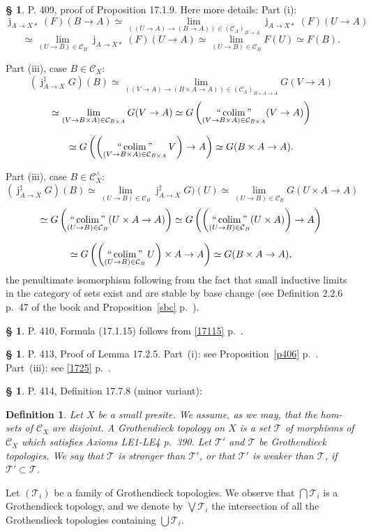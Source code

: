 \documentclass[12pt]{article}
\newtheorem{df}[thm]{Definition}%
\theoremstyle{remark}
\theoremstyle{definition}
\newtheorem{s}[thm]{\S}
\newcommand{\cc}{\mathcal}
\newcommand{\oo}{\operatorname}
\newcommand{\C}{\mathcal C}
\newcommand{\mv}{ (minor variant)}
\DeclareMathOperator*{\coli}{colim}
\DeclareMathOperator*{\ic}{``\coli"}
\begin{document}
%
%
\begin{s}%
P. 409, proof of Proposition 17.1.9. Here more details: Part (i): 
$$
\oo j_{A\to X*}(F)(B\to A)\simeq
\lim_{((U\to A)\to(B\to A))\in(\C_A)_{B\to A}}\oo j_{A\to X*}(F)(U\to A)
$$
$$
\simeq\lim_{(U\to B)\in\C_B}\oo j_{A\to X*}(F)(U\to A)\simeq
\lim_{(U\to B)\in\C_B}F(U)\simeq F(B).
$$

Part (iii), case $B\in\C_X$: 
$$
(\oo j^\ddagger_{A\to X} G)(B)\simeq\lim_{((V\to A)\to(B\times A\to A))\in(\C_A)_{B\times A\to A}}G(V\to A)
$$ 
$$
\simeq\lim_{(V\to B\times A)\in\C_{B\times A}}G(V\to A)\simeq 
G\left(\ic_{(V\to B\times A)\in\C_{B\times A}}(V\to A)\right)
$$

$$
\simeq G\left(\left(\ic_{(V\to B\times A)\in\C_{B\times A}}V\right)\to A\right)\simeq 
G(B\times A\to A).
$$

Part (iii), case $B\in\C_X^\wedge$:
$$
(\oo j^\ddagger_{A\to X} G)(B)\simeq\lim_{(U\to B)\in\C_B}\oo j^\ddagger_{A\to X} G)(U)
\simeq\lim_{(U\to B)\in\C_B}G(U\times A\to A)
$$ 
$$
\simeq G\left(\ic_{(U\to B)\in\C_B}(U\times A\to A)\right)\simeq 
G\left(\left(\ic_{(U\to B)\in\C_B}(U\times A)\right)\to A\right)
$$

$$
\simeq G\left(\left(\ic_{(U\to B)\in\C_B}U\right)\times A\to A\right)
\simeq G(B\times A\to A),
$$ 
the penultimate isomorphism following from the fact that small inductive limits in the category of sets exist and are stable by base change (see Definition 2.2.6 p.~47 of the book and Proposition~\ref{sbc} p.~\pageref{sbc}).
\end{s}
%
%
\begin{s}\label{17115b}
P. 410, Formula (17.1.15) follows from \eqref{17115} p.~\pageref{17115}.
\end{s}
%
%
\begin{s}\label{1725b}
P. 413, Proof of Lemma 17.2.5. Part~(i): see Proposition~\ref{p406} p.~\pageref{p406}. Part~(iii): see \eqref{1725} p.~\pageref{1725}.
\end{s}
%
%
\begin{s} 
P. 414, Definition 17.7.8\mv:
%
\begin{df}\label{1778}
Let $X$ be a small presite. We assume, as we may, that the hom-sets of $\C_X$ are disjoint. A {\em Grothendieck topology} on $X$ is a set $\cc T$ of morphisms of $\C_X$ which satisfies Axioms LE1-LE4 p.~390. Let $\cc T'$ and $\cc T$ be Grothendieck topologies. We say that $\cc T$ is {\em stronger than} $\cc T'$, or that $\cc T'$ is {\em weaker than} $\cc T$, if $\cc T'\subset\cc T$. 
\end{df}
%
Let $(\cc T_i)$ be a family of Grothendieck topologies. We observe that $\bigcap\cc T_i$ is a Grothendieck topology, and we denote by $\bigvee\cc T_i$ the intersection of all the Grothendieck topologies containing $\bigcup\cc T_i$.
\end{s}
\end{document}
